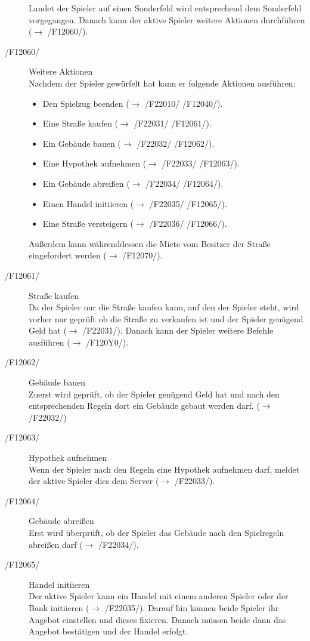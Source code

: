 \documentclass[a4paper,10pt]{article}
\begin{document}
\begin{description}
Landet der Spieler auf einen Sonderfeld wird entsprechend dem Sonderfeld vorgegangen. Danach kann der aktive Spieler weitere Aktionen durchführen ($\rightarrow$ /F12060/).
\item[/F12060/] Weitere Aktionen \\
Nachdem der Spieler gewürfelt hat kann er folgende Aktionen ausführen:
\begin{itemize}
\item Den Spielzug beenden ($\rightarrow$ /F22010/ /F12040/).
\item Eine Straße kaufen ($\rightarrow$ /F22031/ /F12061/).
\item Ein Gebäude bauen ($\rightarrow$ /F22032/ /F12062/).
\item Eine Hypothek aufnehmen ($\rightarrow$ /F22033/ /F12063/).
\item Ein Gebäude abreißen ($\rightarrow$ /F22034/ /F12064/).
\item Einen Handel initiieren ($\rightarrow$ /F22035/ /F12065/).
\item Eine Straße versteigern ($\rightarrow$ /F22036/ /F12066/).
\end{itemize}
Außerdem kann währenddessen die Miete vom Besitzer der Straße eingefordert werden ($\rightarrow$ /F12070/).
\item[/F12061/] Straße kaufen \\
Da der Spieler nur die Straße kaufen kann, auf den der Spieler steht, wird vorher nur geprüft ob die Straße zu verkaufen ist und der Spieler genügend Geld hat ($\rightarrow$ /F22031/). Danach kann der Spieler weitere Befehle ausführen ($\rightarrow$ /F120Y0/).
\item[/F12062/] Gebäude bauen \\
Zuerst wird geprüft, ob der Spieler genügend Geld hat und nach den entsprechenden Regeln dort ein Gebäude gebaut werden darf. ($\rightarrow$ /F22032/)
\item[/F12063/] Hypothek aufnehmen \\
Wenn der Spieler nach den Regeln eine Hypothek aufnehmen darf, meldet der aktive Spieler dies dem Server ($\rightarrow$ /F22033/).
\item[/F12064/] Gebäude abreißen \\
Erst wird überprüft, ob der Spieler das Gebäude nach den Spielregeln abreißen darf ($\rightarrow$ /F22034/).
\item[/F12065/] Handel initiieren \\
Der aktive Spieler kann ein Handel mit einem anderen Spieler oder der Bank initiieren ($\rightarrow$ /F22035/). Darauf hin können beide Spieler ihr Angebot einstellen und dieses fixieren. Danach müssen beide dann das Angebot bestätigen und der Handel erfolgt.

\end{description}
\end{document}
